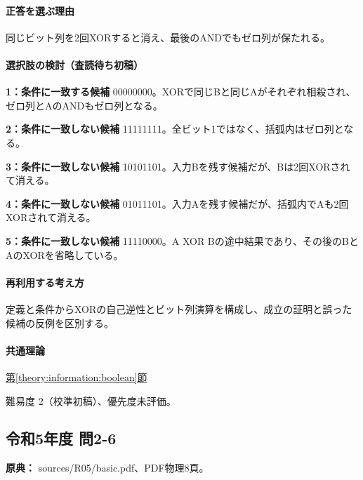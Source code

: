 \paragraph{正答を選ぶ理由} 同じビット列を2回XORすると消え、最後のANDでもゼロ列が保たれる。

\paragraph{選択肢の検討（査読待ち初稿）}\mbox{}\par

\noindent\textbf{1：条件に一致する候補} 00000000。XORで同じBと同じAがそれぞれ相殺され、ゼロ列とAのANDもゼロ列となる。\par

\noindent\textbf{2：条件に一致しない候補} 11111111。全ビット1ではなく、括弧内はゼロ列となる。\par

\noindent\textbf{3：条件に一致しない候補} 10101101。入力Bを残す候補だが、Bは2回XORされて消える。\par

\noindent\textbf{4：条件に一致しない候補} 01011101。入力Aを残す候補だが、括弧内でAも2回XORされて消える。\par

\noindent\textbf{5：条件に一致しない候補} 11110000。A XOR Bの途中結果であり、その後のBとAのXORを省略している。\par

\paragraph{再利用する考え方} 定義と条件からXORの自己逆性とビット列演算を構成し、成立の証明と誤った候補の反例を区別する。

\paragraph{共通理論} \hyperref[theory:information:boolean]{第\ref*{theory:information:boolean}節}

\par 難易度 2（校準初稿）、優先度未評価。

\subsection{令和5年度 問2-6}
\label{q:r05-reg-basic-2-6}

\noindent\textbf{原典：} sources/R05/basic.pdf、PDF物理8頁。

